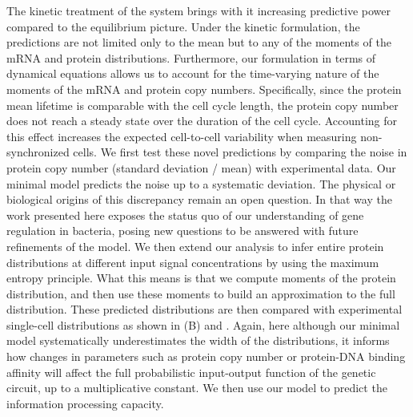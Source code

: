 The kinetic treatment of the system brings with it increasing predictive power
compared to the equilibrium picture. Under the kinetic formulation, the
predictions are not limited only to the mean but to any of the moments of the
mRNA and protein distributions. Furthermore, our formulation in terms of
dynamical equations allows us to account for the time-varying nature of the
moments of the mRNA and protein copy numbers. Specifically, since the protein
mean lifetime is comparable with the cell cycle length, the protein copy number
does not reach a steady state over the duration of the cell cycle. Accounting
for this effect increases the expected cell-to-cell variability when measuring
non-synchronized cells. We first test these novel predictions by comparing the
noise in protein copy number (standard deviation / mean) with experimental data.
Our minimal model predicts the noise up to a systematic deviation. The physical
or biological origins of this discrepancy remain an open question. In that way
the work presented here exposes the status quo of our understanding of gene
regulation in bacteria, posing new questions to be answered with future
refinements of the model. We then extend our analysis to infer entire protein
distributions at different input signal concentrations by using the maximum
entropy principle. What this means is that we compute moments of the protein
distribution, and then use these moments to build an approximation to the full
distribution. These predicted distributions are then compared with experimental
single-cell distributions as shown in (B) and
. Again, here although our minimal model systematically
underestimates the width of the distributions, it informs how changes in
parameters such as protein copy number or protein-DNA binding affinity will
affect the full probabilistic input-output function of the genetic circuit, up
to a multiplicative constant. We then use our model to predict the information
processing capacity.

